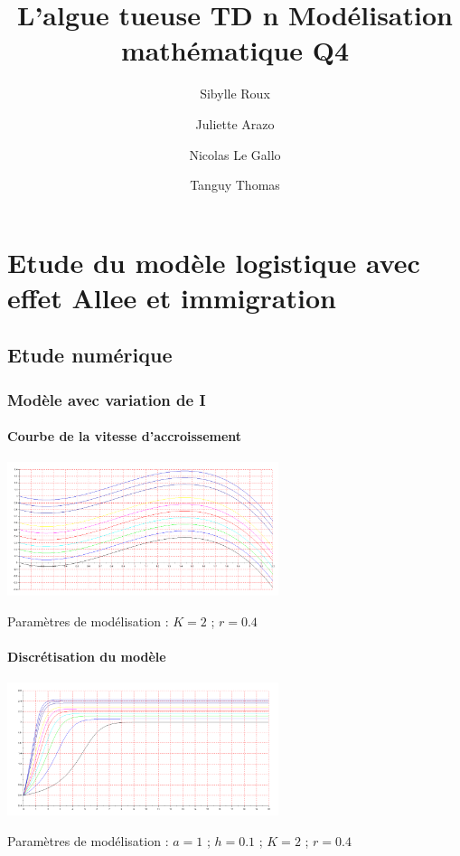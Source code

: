 \documentclass{article}
\begin{document}
\title{L'algue tueuse
	\smallbreak
	TD n
	\smallbreak
	Modélisation mathématique
	\smallbreak
	Q4}
\author{Sibylle Roux \and Juliette Arazo \and Nicolas Le Gallo \and Tanguy Thomas}


\maketitle

\newpage

\tableofcontents

\newpage

\section{Etude du modèle logistique avec effet Allee et immigration}

\subsection{Etude numérique}

\subsubsection{Modèle avec variation de I}

\paragraph{Courbe de la vitesse d'accroissement}
\begin{center}
\includegraphics[width=300px]{img/part1/AlleeI.png}
\end{center}
Paramètres de modélisation : $K=2$  ; $r=0.4$ 
\paragraph{}

\newpage

\paragraph{Discrétisation du modèle}
\begin{center}
\includegraphics[width=300px]{img/part1/TrajI.png}
\end{center}
Paramètres de modélisation : $a=1$ ; $h=0.1$ ; $K=2$  ; $r=0.4$
\end{document}

